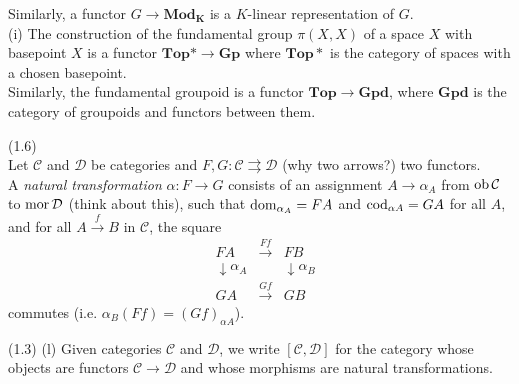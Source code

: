 \documentclass[a4paper]{article}
\begin{document}
\begin{eg}
    Similarly, a functor $G \to \mathbf{Mod_K}$ is a $K$-linear representation of $G$.\\
    (i) The construction of the fundamental group $\pi(X,X)$ of a space $X$ with basepoint $X$ is a functor $\mathbf{Top}* \to \mathbf{Gp}$ where $\mathbf{Top}*$ is the category of spaces with a chosen basepoint.\\
    Similarly, the fundamental groupoid is a functor $\mathbf{Top} \to \mathbf{Gpd}$, where $\mathbf{Gpd}$ is the category of groupoids and functors between them.
\end{eg}

\begin{defi} (1.6)\\
    Let $\mathcal{C}$ and $\mathcal{D}$ be categories and $F, G: \mathcal{C}\rightrightarrows \mathcal{D}$ (why two arrows?) two functors.\\
    A \emph{natural transformation} $\alpha:F \to G$ consists of an assignment $A \to \alpha_A$ from $\operatorname{ob} \mathcal{C}$ to $\operatorname{mor} \mathcal{D}$ (think about this), such that $\operatorname{dom}_{\alpha_A} = FA$ and $\operatorname{cod}_{\alpha A} = G A$ for all $A$, and for all $A \xrightarrow{f} B$ in $\mathcal{C}$, the square 
    \begin{equation*}
        \begin{aligned}
            &FA &\xrightarrow{Ff} &FB\\
            &\downarrow \alpha_A & &\downarrow \alpha_B\\
            &GA &\xrightarrow{Gf} & GB
        \end{aligned}
    \end{equation*}
    commutes (i.e. $\alpha_B(Ff) = (Gf)_{\alpha A}$).
\end{defi}

(1.3) (l) Given categories $\mathcal{C}$ and $\mathcal{D}$, we write $[\mathcal{C},\mathcal{D}]$ for the category whose objects are functors $\mathcal{C} \to \mathcal{D}$ and whose morphisms are natural transformations.
\end{document}
